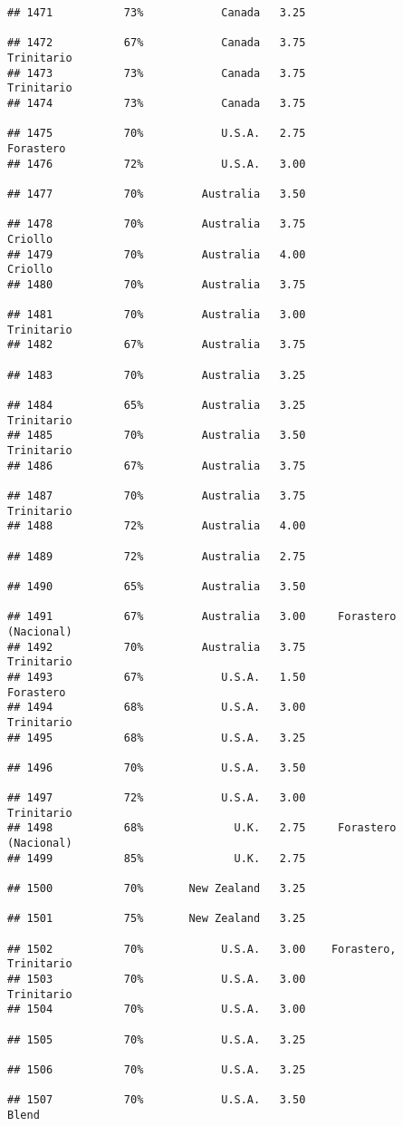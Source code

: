 \documentclass[
]{article}
\begin{document}
\begin{verbatim}
## 1471           73%            Canada   3.25                         
## 1472           67%            Canada   3.75               Trinitario
## 1473           73%            Canada   3.75               Trinitario
## 1474           73%            Canada   3.75                         
## 1475           70%            U.S.A.   2.75                Forastero
## 1476           72%            U.S.A.   3.00                         
## 1477           70%         Australia   3.50                         
## 1478           70%         Australia   3.75                  Criollo
## 1479           70%         Australia   4.00                  Criollo
## 1480           70%         Australia   3.75                         
## 1481           70%         Australia   3.00               Trinitario
## 1482           67%         Australia   3.75                         
## 1483           70%         Australia   3.25                         
## 1484           65%         Australia   3.25               Trinitario
## 1485           70%         Australia   3.50               Trinitario
## 1486           67%         Australia   3.75                         
## 1487           70%         Australia   3.75               Trinitario
## 1488           72%         Australia   4.00                         
## 1489           72%         Australia   2.75                         
## 1490           65%         Australia   3.50                         
## 1491           67%         Australia   3.00     Forastero (Nacional)
## 1492           70%         Australia   3.75               Trinitario
## 1493           67%            U.S.A.   1.50                Forastero
## 1494           68%            U.S.A.   3.00               Trinitario
## 1495           68%            U.S.A.   3.25                         
## 1496           70%            U.S.A.   3.50                         
## 1497           72%            U.S.A.   3.00               Trinitario
## 1498           68%              U.K.   2.75     Forastero (Nacional)
## 1499           85%              U.K.   2.75                         
## 1500           70%       New Zealand   3.25                         
## 1501           75%       New Zealand   3.25                         
## 1502           70%            U.S.A.   3.00    Forastero, Trinitario
## 1503           70%            U.S.A.   3.00               Trinitario
## 1504           70%            U.S.A.   3.00                         
## 1505           70%            U.S.A.   3.25                         
## 1506           70%            U.S.A.   3.25                         
## 1507           70%            U.S.A.   3.50                    Blend

\end{verbatim}
\end{document}
